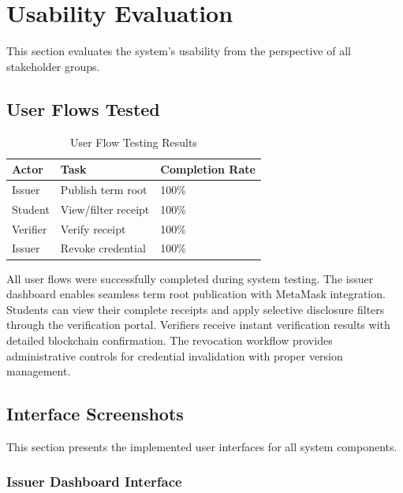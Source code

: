 \section{Usability Evaluation}
\label{sec:usability}

This section evaluates the system's usability from the perspective of all stakeholder groups.

\subsection{User Flows Tested}
\label{subsec:user-flows}

\begin{table}[H]
\centering
\caption{User Flow Testing Results}
\label{tab:user-flows}
\begin{tabular}{|p{3.5cm}|p{5cm}|p{3.5cm}|}
\hline
\textbf{Actor} & \textbf{Task} & \textbf{Completion Rate} \\
\hline
Issuer & Publish term root & 100\% \\
\hline
Student & View/filter receipt & 100\% \\
\hline
Verifier & Verify receipt & 100\% \\
\hline
Issuer & Revoke credential & 100\% \\
\hline
\end{tabular}
\end{table}

All user flows were successfully completed during system testing. The issuer dashboard enables seamless term root publication with MetaMask integration. Students can view their complete receipts and apply selective disclosure filters through the verification portal. Verifiers receive instant verification results with detailed blockchain confirmation. The revocation workflow provides administrative controls for credential invalidation with proper version management.

\subsection{Interface Screenshots}
\label{subsec:interface-screenshots}

This section presents the implemented user interfaces for all system components.

\subsubsection{Issuer Dashboard Interface}

